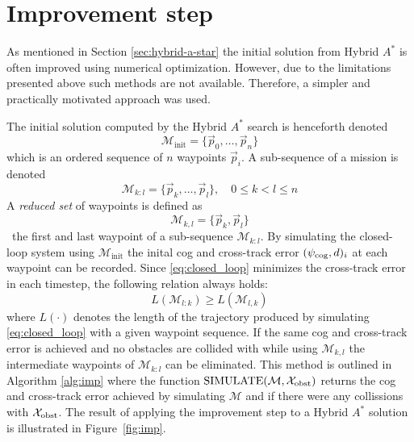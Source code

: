 \section{Improvement step}
As mentioned in Section \ref{sec:hybrid-a-star} the initial solution from Hybrid $A^*$ is often improved using numerical optimization. 
However, due to the limitations presented above such methods are not available. Therefore, a simpler and practically motivated approach was used.

The initial solution computed by the Hybrid $A^*$ search is henceforth denoted
\begin{equation}
    \mathcal{M}_{\text{init}}=\{\vec{p}_0,\hdots,\vec{p}_n\}    
\end{equation}
which is an ordered sequence of $n$ waypoints $\vec{p}_i$. A sub-sequence of a mission is denoted
\begin{equation}
    \mathcal{M}_{k:l}=\{\vec{p}_k,\hdots,\vec{p}_l\}, \quad 0\leq k<l\leq n
\end{equation}
A \textit{reduced set} of waypoints is defined as 
\begin{equation}
    \mathcal{M}_{k,l}=\{\vec{p}_k,\vec{p}_l\}
\end{equation}
\ie\ the first and last waypoint of a sub-sequence $\mathcal{M}_{k:l}$. By simulating the closed-loop system using $\mathcal{M}_{\text{init}}$ the inital \ac{cog} and cross-track error $(\psi_{\text{cog}},d)_i$ at each waypoint can be recorded. 
Since \eqref{eq:closed_loop} minimizes the cross-track error in each timestep, the following relation always holds:
\begin{equation}
    L(\mathcal{M}_{l:k})\geq L(\mathcal{M}_{l,k})
\end{equation}
where $L(\cdot)$ denotes the length of the trajectory produced by simulating \eqref{eq:closed_loop} with a given waypoint sequence. If the same \ac{cog} and cross-track error 
is achieved and no obstacles are collided with while using $\mathcal{M}_{k,l}$ the intermediate waypoints of $\mathcal{M}_{k:l}$ can be eliminated. This method is outlined in Algorithm \eqref{alg:imp} where 
the function $\text{SIMULATE}(\mathcal{M},\mathcal{X}_{\text{obst}})$ returns the \ac{cog} and cross-track error achieved by simulating $\mathcal{M}$ and if there were any 
collissions with $\mathcal{X}_{\text{obst}}$. The result of applying the improvement step to a Hybrid $A^*$ solution is illustrated in Figure~\ref{fig:imp}.

